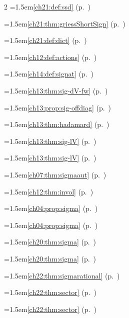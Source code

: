 \begin{multicols}{2}
\hangindent=1.5em\quad \ref{ch21:def:ssd} (p.~\pageref{ch21:def:ssd})\par
\hangindent=1.5em\quad \ref{ch21:thm:griessShortSign} (p.~\pageref{ch21:thm:griessShortSign})\par
\hangindent=1.5em\quad \ref{ch21:def:dict} (p.~\pageref{ch21:def:dict})\par
\hangindent=1.5em\quad \ref{ch12:def:actions} (p.~\pageref{ch12:def:actions})\par
\hangindent=1.5em\quad \ref{ch14:def:signat} (p.~\pageref{ch14:def:signat})\par
\hangindent=1.5em\quad \ref{ch13:thm:sig-dV-fw} (p.~\pageref{ch13:thm:sig-dV-fw})\par
\hangindent=1.5em\quad \ref{ch13:prop:sig-offdiag} (p.~\pageref{ch13:prop:sig-offdiag})\par
\hangindent=1.5em\quad \ref{ch13:thm:hadamard} (p.~\pageref{ch13:thm:hadamard})\par
\hangindent=1.5em\quad \ref{ch13:thm:sig-lV} (p.~\pageref{ch13:thm:sig-lV})\par
\hangindent=1.5em\quad \ref{ch13:thm:sig-lV} (p.~\pageref{ch13:thm:sig-lV})\par
\hangindent=1.5em\quad \ref{ch07:thm:sigmaaut} (p.~\pageref{ch07:thm:sigmaaut})\par
\hangindent=1.5em\quad \ref{ch12:thm:invol} (p.~\pageref{ch12:thm:invol})\par
\hangindent=1.5em\quad \ref{ch04:prop:sigma} (p.~\pageref{ch04:prop:sigma})\par
\hangindent=1.5em\quad \ref{ch04:prop:sigma} (p.~\pageref{ch04:prop:sigma})\par
\hangindent=1.5em\quad \ref{ch20:thm:sigma} (p.~\pageref{ch20:thm:sigma})\par
\hangindent=1.5em\quad \ref{ch20:thm:sigma} (p.~\pageref{ch20:thm:sigma})\par
\hangindent=1.5em\quad \ref{ch22:thm:sigmarational} (p.~\pageref{ch22:thm:sigmarational})\par
\hangindent=1.5em\quad \ref{ch22:thm:sector} (p.~\pageref{ch22:thm:sector})\par
\hangindent=1.5em\quad \ref{ch22:thm:sector} (p.~\pageref{ch22:thm:sector})\par

\end{multicols}
